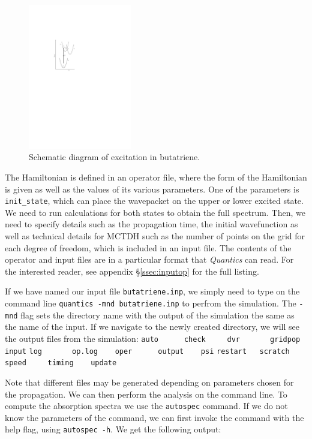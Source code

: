 \documentclass[12pt]{article}
\begin{document}
\begin{figure}
    \includegraphics[page=1,width=0.4\textwidth]{img/butatriene_excitation.pdf}
    \caption{Schematic diagram of excitation in butatriene.}
    \label{fig:butatriene_excitation}
\end{figure}

The Hamiltonian is defined in an operator file, where the form of the Hamiltonian is given as well as the values of its various parameters. One of the parameters is \texttt{init\_state}, which can place the wavepacket on the upper or lower excited state. We need to run calculations for both states to obtain the full spectrum.  Then, we need to specify details such as the propagation time, the initial wavefunction as well as technical details for MCTDH such as the number of points on the grid for each degree of freedom, which is included in an input file. The contents of the operator and input files are in a particular format that \textit{Quantics} can read. For the interested reader, see appendix \S\ref{ssec:inputop} for the full listing.

If we have named our input file \texttt{butatriene.inp}, we simply need to type on the command line \texttt{quantics -mnd butatriene.inp} to perfrom the simulation. The \texttt{-mnd} flag sets the directory name with the output of the simulation the same as the name of the input. If we navigate to the newly created directory, we will see the output files from the simulation:
\newline\verb|auto      check     dvr       gridpop   input|
\newline\verb|log       op.log    oper      output    psi|
\newline\verb|restart   scratch   speed     timing    update|

Note that different files may be generated depending on parameters chosen for the propagation. We can then perform the analysis on the command line. To compute the absorption spectra we use the \texttt{autospec} command. If we do not know the parameters of the command, we can first invoke the command with the help flag, using \texttt{autospec -h}. We get the following output:
\end{document}
